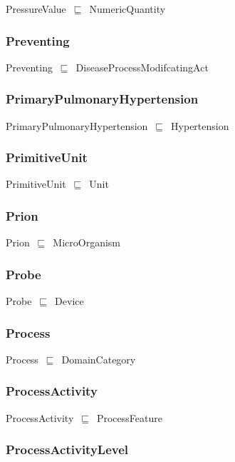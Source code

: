 \documentclass{article}
\begin{document}
PressureValue~\ensuremath{\sqsubseteq}~NumericQuantity~

\subsubsection*{Preventing}

Preventing~\ensuremath{\sqsubseteq}~DiseaseProcessModifcatingAct~

\subsubsection*{PrimaryPulmonaryHypertension}

PrimaryPulmonaryHypertension~\ensuremath{\sqsubseteq}~Hypertension~

\subsubsection*{PrimitiveUnit}

PrimitiveUnit~\ensuremath{\sqsubseteq}~Unit~

\subsubsection*{Prion}

Prion~\ensuremath{\sqsubseteq}~MicroOrganism~

\subsubsection*{Probe}

Probe~\ensuremath{\sqsubseteq}~Device~

\subsubsection*{Process}

Process~\ensuremath{\sqsubseteq}~DomainCategory~

\subsubsection*{ProcessActivity}

ProcessActivity~\ensuremath{\sqsubseteq}~ProcessFeature~

\subsubsection*{ProcessActivityLevel}
\end{document}
